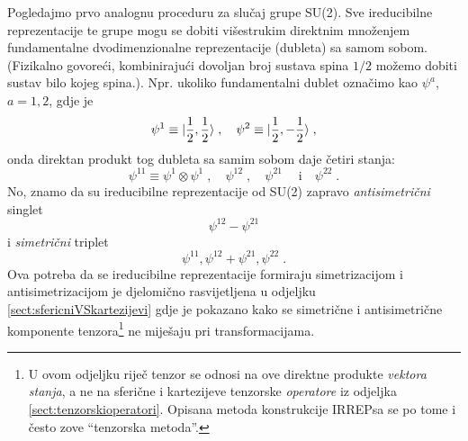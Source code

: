 Pogledajmo prvo analognu proceduru za slučaj grupe SU(2).
Sve ireducibilne reprezentacije te grupe mogu se dobiti
višestrukim direktnim množenjem fundamentalne dvodimenzionalne reprezentacije
(dubleta) sa samom sobom. (Fizikalno govoreći, kombinirajući dovoljan broj
sustava spina $1/2$ možemo dobiti sustav bilo kojeg spina.). Npr. ukoliko
fundamentalni dublet označimo kao
$\psi^a$, $a=1,2$, gdje je 
\begin{displaymath}
 \psi^1 \equiv | \frac{1}{2},\frac{1}{2} \rangle \;, \quad \psi^2
\equiv | \frac{1}{2}, -\frac{1}{2} \rangle \;,
\end{displaymath}
onda direktan produkt tog dubleta sa samim sobom daje četiri stanja:
\begin{displaymath}
 \psi^{11}\equiv \psi^1 \otimes \psi^1 \;, \quad \psi^{12} \;, \quad \psi^{21} \;
 \quad \text{i} \quad \psi^{22} \;.
\end{displaymath}
No, znamo da su ireducibilne reprezentacije od SU(2) zapravo 
\emph{antisimetrični} singlet
\begin{displaymath}
   \psi^{12} - \psi^{21}
\end{displaymath}
i \emph{simetrični} triplet
\begin{displaymath}
 \psi^{11},  \psi^{12} + \psi^{21}, \psi^{22} \;.
\end{displaymath}
Ova potreba da se ireducibilne reprezentacije formiraju 
simetrizacijom i antisimetrizacijom je djelomično rasvijetljena
u odjeljku \ref{sect:sfericniVSkartezijevi} gdje je pokazano 
kako se simetrične i antisimetrične komponente 
tenzora\footnote{U ovom odjeljku riječ tenzor se odnosi na ove
direktne produkte \emph{vektora stanja}, a ne na sferične i kartezijeve
tenzorske \emph{operatore} iz odjeljka \protect\ref{sect:tenzorskioperatori}.
Opisana metoda konstrukcije IRREPsa se po tome i često zove 
``tenzorska metoda''.} ne miješaju pri transformacijama.

